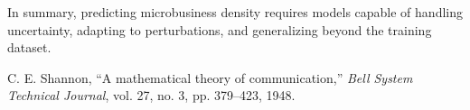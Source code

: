 \documentclass[conference]{IEEEtran}
\begin{document}
In summary, predicting microbusiness density requires models capable of handling uncertainty, adapting to perturbations, and generalizing beyond the training dataset.


\begin{thebibliography}{1}
C. E. Shannon, ``A mathematical theory of communication,'' \textit{Bell System Technical Journal}, vol. 27, no. 3, pp. 379--423, 1948.
\end{thebibliography}
\end{document}
